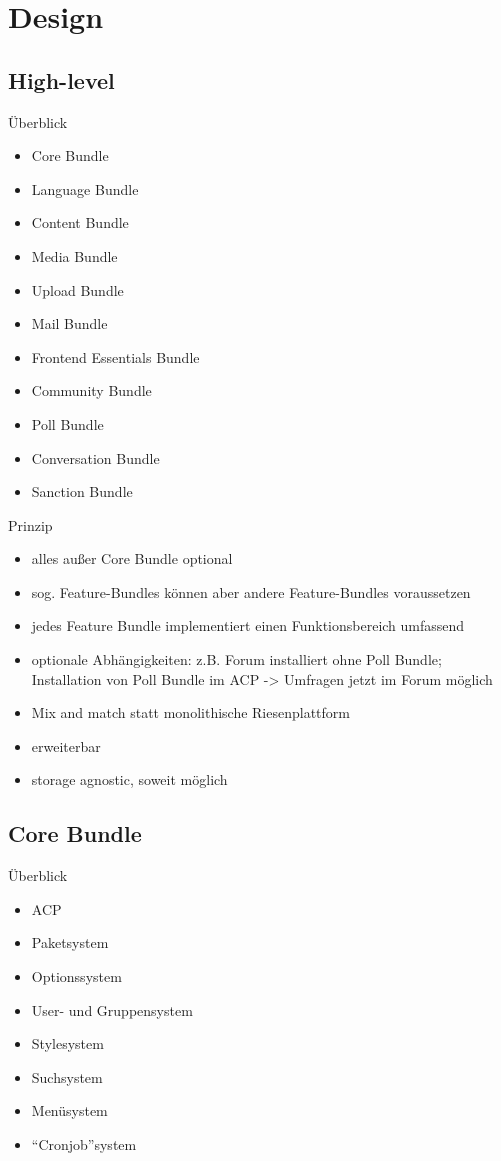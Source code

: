 \documentclass{beamer}
\begin{document}
\section{Design}
\subsection{High-level}
\begin{frame}{Überblick}
  \begin{itemize}
    \item Core Bundle
    \item Language Bundle
    \item Content Bundle
    \item Media Bundle
    \item Upload Bundle
    \item Mail Bundle
    \item Frontend Essentials Bundle
    \item Community Bundle
    \item Poll Bundle
    \item Conversation Bundle
    \item Sanction Bundle
  \end{itemize}
\end{frame}
\begin{frame}{Prinzip}
  \begin{itemize}
    \item alles außer Core Bundle optional
    \item sog. Feature-Bundles können aber andere Feature-Bundles voraussetzen
    \item jedes Feature Bundle implementiert einen Funktionsbereich umfassend
    \item optionale Abhängigkeiten: z.B. Forum installiert ohne Poll Bundle;
          Installation von Poll Bundle im ACP -> Umfragen jetzt im Forum möglich
    \item Mix and match statt monolithische Riesenplattform
    \item erweiterbar
    \item storage agnostic, soweit möglich
  \end{itemize}
\end{frame}
\subsection{Core Bundle}
\begin{frame}{Überblick}
  \begin{itemize}
      \item ACP
      \item Paketsystem
      \item Optionssystem
      \item User- und Gruppensystem
      \item Stylesystem
      \item Suchsystem
      \item Menüsystem
      \item ``Cronjob''system
    \end{itemize}
\end{frame}
\end{document}
